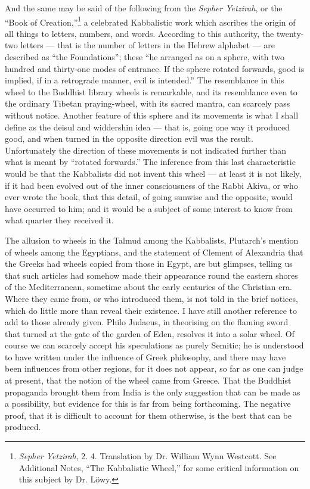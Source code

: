\documentclass[a4paper, 11pt, oneside, polutonikogreek, english]{article}
\begin{document}
And the same may be said of the following from the \emph{Sepher Yetzirah}, or the ``Book of Creation,''\footnote{\emph{Sepher Yetzirah}, 2. 4. Translation by Dr. William Wynn Westcott. See Additional Notes, ``The Kabbalistic Wheel,'' for some critical information on this subject by Dr. Löwy.} a celebrated Kabbalistic work which ascribes the origin of all things to letters, numbers, and words. According to this authority, the twenty-two letters --- that is the number of letters in the Hebrew alphabet --- are described as ``the Foundations''; these ``he arranged as on a sphere, with two hundred and thirty-one modes of entrance. If the sphere rotated forwards, good is implied, if in a retrograde manner, evil is intended.'' The resemblance in this wheel to the Buddhist library wheels is remarkable, and its resemblance even to the ordinary Tibetan praying-wheel, with its sacred mantra, can scarcely pass without notice. Another feature of this sphere and its movements is what I shall define as the deisul and widdershin idea --- that is, going one way it produced good, and when turned in the opposite direction evil was the result. Unfortunately the direction of these movements is not indicated further than what is meant by ``rotated forwards.'' The inference from this last characteristic would be that the Kabbalists did not invent this wheel --- at least it is not likely, if it had been evolved out of the inner consciousness of the Rabbi Akiva, or who ever wrote the book, that this detail, of going sunwise and the opposite, would have occurred to him; and it would be a subject of some interest to know from what quarter they received it.

The allusion to wheels in the Talmud among the Kabbalists, Plutarch's mention of wheels among the Egyptians, and the statement of Clement of Alexandria that the Greeks had wheels copied from those in Egypt, are but glimpses, telling us that such articles had somehow made their appearance round the eastern shores of the Mediterranean, sometime about the early centuries of the Christian era. Where they came from, or who introduced them, is not told in the brief notices, which do little more than reveal their existence. I have still another reference to add to those already given. Philo Judaeus, in theorising on the flaming sword that turned at the gate of the garden of Eden, resolves it into a solar wheel. Of course we can scarcely accept his speculations as purely Semitic; he is understood to have written under the influence of Greek philosophy, and there may have been influences from other regions, for it does not appear, so far as one can judge at present, that the notion of the wheel came from Greece. That the Buddhist propaganda brought them from India is the only suggestion that can be made as a possibility, but evidence for this is far from being forthcoming. The negative proof, that it is difficult to account for them otherwise, is the best that can be produced.
\end{document}
